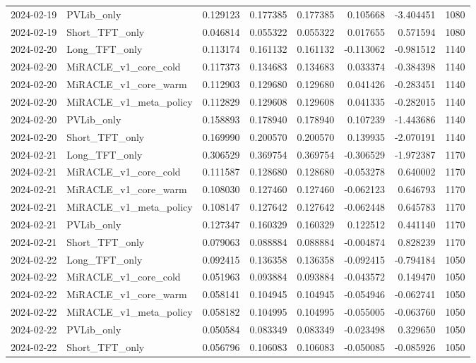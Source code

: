 \begin{tabular}{llrrrrrr}
2024-02-19 & PVLib_only & 0.129123 & 0.177385 & 0.177385 & 0.105668 & -3.404451 & 1080 \\
2024-02-19 & Short_TFT_only & 0.046814 & 0.055322 & 0.055322 & 0.017655 & 0.571594 & 1080 \\
2024-02-20 & Long_TFT_only & 0.113174 & 0.161132 & 0.161132 & -0.113062 & -0.981512 & 1140 \\
2024-02-20 & MiRACLE_v1_core_cold & 0.117373 & 0.134683 & 0.134683 & 0.033374 & -0.384398 & 1140 \\
2024-02-20 & MiRACLE_v1_core_warm & 0.112903 & 0.129680 & 0.129680 & 0.041426 & -0.283451 & 1140 \\
2024-02-20 & MiRACLE_v1_meta_policy & 0.112829 & 0.129608 & 0.129608 & 0.041335 & -0.282015 & 1140 \\
2024-02-20 & PVLib_only & 0.158893 & 0.178940 & 0.178940 & 0.107239 & -1.443686 & 1140 \\
2024-02-20 & Short_TFT_only & 0.169990 & 0.200570 & 0.200570 & 0.139935 & -2.070191 & 1140 \\
2024-02-21 & Long_TFT_only & 0.306529 & 0.369754 & 0.369754 & -0.306529 & -1.972387 & 1170 \\
2024-02-21 & MiRACLE_v1_core_cold & 0.111587 & 0.128680 & 0.128680 & -0.053278 & 0.640002 & 1170 \\
2024-02-21 & MiRACLE_v1_core_warm & 0.108030 & 0.127460 & 0.127460 & -0.062123 & 0.646793 & 1170 \\
2024-02-21 & MiRACLE_v1_meta_policy & 0.108147 & 0.127642 & 0.127642 & -0.062448 & 0.645783 & 1170 \\
2024-02-21 & PVLib_only & 0.127347 & 0.160329 & 0.160329 & 0.122512 & 0.441140 & 1170 \\
2024-02-21 & Short_TFT_only & 0.079063 & 0.088884 & 0.088884 & -0.004874 & 0.828239 & 1170 \\
2024-02-22 & Long_TFT_only & 0.092415 & 0.136358 & 0.136358 & -0.092415 & -0.794184 & 1050 \\
2024-02-22 & MiRACLE_v1_core_cold & 0.051963 & 0.093884 & 0.093884 & -0.043572 & 0.149470 & 1050 \\
2024-02-22 & MiRACLE_v1_core_warm & 0.058141 & 0.104945 & 0.104945 & -0.054946 & -0.062741 & 1050 \\
2024-02-22 & MiRACLE_v1_meta_policy & 0.058182 & 0.104995 & 0.104995 & -0.055005 & -0.063760 & 1050 \\
2024-02-22 & PVLib_only & 0.050584 & 0.083349 & 0.083349 & -0.023498 & 0.329650 & 1050 \\
2024-02-22 & Short_TFT_only & 0.056796 & 0.106083 & 0.106083 & -0.050085 & -0.085926 & 1050 \\

\end{tabular}
